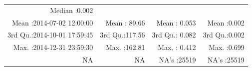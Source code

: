 \documentclass[
  10pt,
  a4paper,oneside]{article}
\begin{document}
\begin{longtable}[]{@{}rrrr@{}}
\begin{minipage}[t]{0.19\columnwidth}
Median :0.002\strut
\end{minipage}\tabularnewline
\begin{minipage}[t]{0.33\columnwidth}\raggedleft
Mean :2014-07-02 12:00:00\strut
\end{minipage} & \begin{minipage}[t]{0.19\columnwidth}\raggedleft
Mean : 89.66\strut
\end{minipage} & \begin{minipage}[t]{0.19\columnwidth}\raggedleft
Mean : 0.053\strut
\end{minipage} & \begin{minipage}[t]{0.19\columnwidth}\raggedleft
Mean :0.002\strut
\end{minipage}\tabularnewline
\begin{minipage}[t]{0.33\columnwidth}\raggedleft
3rd Qu.:2014-10-01 17:59:45\strut
\end{minipage} & \begin{minipage}[t]{0.19\columnwidth}\raggedleft
3rd Qu.:117.56\strut
\end{minipage} & \begin{minipage}[t]{0.19\columnwidth}\raggedleft
3rd Qu.: 0.082\strut
\end{minipage} & \begin{minipage}[t]{0.19\columnwidth}\raggedleft
3rd Qu.:0.002\strut
\end{minipage}\tabularnewline
\begin{minipage}[t]{0.33\columnwidth}\raggedleft
Max. :2014-12-31 23:59:30\strut
\end{minipage} & \begin{minipage}[t]{0.19\columnwidth}\raggedleft
Max. :162.81\strut
\end{minipage} & \begin{minipage}[t]{0.19\columnwidth}\raggedleft
Max. : 0.412\strut
\end{minipage} & \begin{minipage}[t]{0.19\columnwidth}\raggedleft
Max. :0.699\strut
\end{minipage}\tabularnewline
\begin{minipage}[t]{0.33\columnwidth}\raggedleft
NA\strut
\end{minipage} & \begin{minipage}[t]{0.19\columnwidth}\raggedleft
NA\strut
\end{minipage} & \begin{minipage}[t]{0.19\columnwidth}\raggedleft
NA's :25519\strut
\end{minipage} & \begin{minipage}[t]{0.19\columnwidth}\raggedleft
NA's :25519\strut
\end{minipage}\tabularnewline
\bottomrule
\end{longtable}
\end{document}
